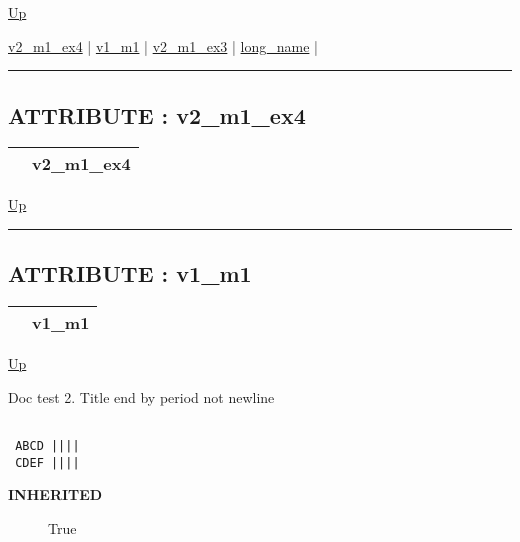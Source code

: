 \hyperlink{ecldoc:intest.in1intest.example_4}{Up}

\par


\hyperlink{ecldoc:intest.in1intest.example_4.mod_1.v2_m1_ex4}{v2\_m1\_ex4}  |
\hyperlink{ecldoc:example_3.mod_1.v1_m1}{v1\_m1}  |
\hyperlink{ecldoc:example_3.mod_1.v2_m1_ex3}{v2\_m1\_ex3}  |
\hyperlink{ecldoc:example_3.mod_1.long_name}{long\_name}  |

\rule{\textwidth}{0.4pt}

\subsection*{ATTRIBUTE : v2\_m1\_ex4}
\hypertarget{ecldoc:intest.in1intest.example_4.mod_1.v2_m1_ex4}{}

{\renewcommand{\arraystretch}{1.5}
\begin{tabularx}{\textwidth}{|>{\raggedright\arraybackslash}l|X|}
\hline
\hspace{0pt} & v2\_m1\_ex4 \\
\hline
\end{tabularx}
}

\hyperlink{ecldoc:intest.in1intest.example_4.mod_1}{Up}

\par


\rule{\textwidth}{0.4pt}
\subsection*{ATTRIBUTE : v1\_m1}
\hypertarget{ecldoc:example_3.mod_1.v1_m1}{}

{\renewcommand{\arraystretch}{1.5}
\begin{tabularx}{\textwidth}{|>{\raggedright\arraybackslash}l|X|}
\hline
\hspace{0pt} & v1\_m1 \\
\hline
\end{tabularx}
}

\hyperlink{ecldoc:intest.in1intest.example_4.mod_1}{Up}

\par
Doc test 2. Title end by period not newline 
\begin{verbatim}

 ABCD ||||
 CDEF ||||\end{verbatim}



\par
\begin{description}
\item [\textbf{INHERITED}] True
\end{description}

